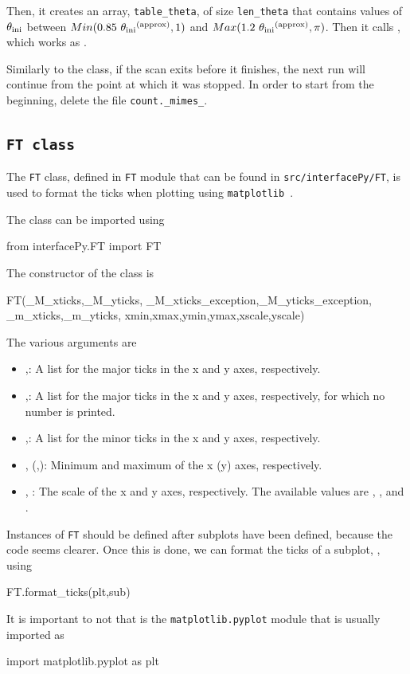 \documentclass[11pt,a4paper]{article}
\begin{document}
Then, it creates an array, {\tt table\_theta}, of size {\tt len\_theta} that contains values of $\theta_{\rm ini}{}$ between $Min(0.85 \ \theta_{\rm ini}{}^{\rm (approx)},1)$ and  
$Max(1.2 \ \theta_{\rm ini}{}^{\rm (approx)},\pi)$.  Then it calls , which works as . 



Similarly to the  class, if the scan exits before it finishes, the next run will continue from the point at which it was stopped.
In order to start from the beginning, delete the file {\tt count.\_mimes\_}.



\subsection{\tt FT class}
%
The {\tt FT} class, defined in {\tt FT} module that can be found in {\tt src/interfacePy/FT}, is used to format the ticks when plotting using {\tt matplotlib}~\cite{Hunter:2007}. 

The class can be imported using
%
\begin{py}
	from interfacePy.FT import FT 
\end{py} 
%
The constructor of the class is
%
\begin{py}
	FT(_M_xticks,_M_yticks, _M_xticks_exception,_M_yticks_exception, _m_xticks,_m_yticks,
			xmin,xmax,ymin,ymax,xscale,yscale)
\end{py}
%
The various arguments are
%
\begin{itemize}
	\item {},: A list for  the major ticks in the x and y axes, respectively.
	\item {},: A list for  the major ticks in the x and y axes, respectively, for which no number is printed.
	\item {},: A list for  the minor ticks in the x and y axes, respectively.
	\item {},  (,): Minimum and maximum of the x (y) axes, respectively. 
	\item {}, : The scale of the x and y axes, respectively. The available values are , , and . 
\end{itemize}


Instances of {\tt FT} should be defined after subplots have been defined, because the code seems clearer. Once this is done, we can format the ticks of a subplot, , using  
%
\begin{py}
	FT.format_ticks(plt,sub)
\end{py}
%
It is important to not that  is the {\tt matplotlib.pyplot} module that is usually imported as
%
\begin{py}
	import matplotlib.pyplot as plt
\end{py}
\end{document}
